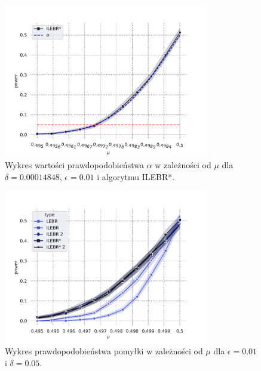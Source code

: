 \documentclass[inzynierska]{pwr_wmat_praca_dyplomowa}
\theoremstyle{plain}
\numberwithin{theorem}{chapter}
\theoremstyle{definition}
\numberwithin{theorem}{chapter}
\begin{document}
	\begin{figure}
		\centering
		\includegraphics[width=0.8\textwidth]{imagens/test_powrs_alpha_0_05.pdf}
		\caption{Wykres wartości prawdopodobieństwa $\alpha$ w zależności od $\mu$ dla $\delta =0.00014848$, $\epsilon =0.01$ i algorytmu ILEBR*.}
		\label{fig:test_powrs_alpha_0_05}
	\end{figure}
	\begin{figure}
		\centering
		\includegraphics[width=0.8\textwidth]{imagens/test_powrs.pdf}
		\caption{Wykres prawdopodobieństwa pomyłki w zależności od $\mu$ dla $\epsilon=0.01$ i $\delta = 0.05$.}
		\label{fig:test_powrs}
	\end{figure}
\end{document}

